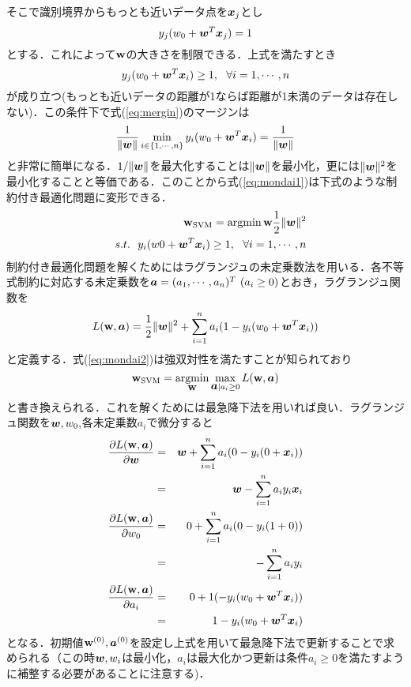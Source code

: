 \documentclass[a4j]{jsarticle}
\def\vec#1{\mbox{\boldmath $#1$}}
\newcommand{\argmin}{\mathop{\rm argmin}\limits}
\begin{document}
そこで識別境界からもっとも近いデータ点を$\vec{x}_j$とし
\begin{equation}
	y_j(w_0+\vec{w}^T\vec{x}_j)=1
\end{equation}
とする．これによって$\vec{\rm w}$の大きさを制限できる．上式を満たすとき
\begin{equation}
	\label{omomi_seigen}
		y_j(w_0+\vec{w}^T\vec{x}_i)\ge 1,~~\forall i=1,\cdots,n
\end{equation}
が成り立つ(もっとも近いデータの距離が1ならば距離が1未満のデータは存在しない)．この条件下で式(\ref{eq:mergin})のマージンは
\begin{equation}
	\frac{1}{\| \vec w \|}\min_{i \in \{1,\cdots,n\}}y_i (w_0 + \vec{w}^T \vec{x}_i) = \frac{1}{\| \vec w \|}
\end{equation}
と非常に簡単になる．$1/\|\vec w\|$を最大化することは$\|\vec w\|$を最小化，更には$\| \vec w\|^2$を最小化することと等価である．このことから式(\ref{eq:mondai1})は下式のような制約付き最適化問題に変形できる．
\begin{eqnarray}
	\label{eq:mondai2}
	&&\vec{\rm w}_{\rm SVM} = \argmin{\vec{\rm w}}\frac{1}{2}\|\vec w\|^2 \nonumber \\
	&&s.t.~~y_i(w0+\vec{w}^T\vec{x}_i)\ge 1,~~\forall i=1,\cdots,n
\end{eqnarray}
制約付き最適化問題を解くためにはラグランジュの未定乗数法を用いる．各不等式制約に対応する未定乗数を$\vec{a}=(a_1,\cdots,a_n)^T~(a_i\ge0)$とおき，ラグランジュ関数を
\begin{equation}
	L(\vec{\rm w},\vec a) = \frac{1}{2}\|\vec w\|^2 +\sum^{n}_{i=1}a_i(1-y_i(w_0 + \vec{w}^T\vec{x}_i))
\end{equation}
と定義する．式(\ref{eq:mondai2})は強双対性を満たすことが知られており\cite{強双対}
\begin{equation}
	\vec{\rm w}_{\rm SVM} = \argmin_{\vec{\rm w}} \max_{\vec{a}|a_i\ge0}L(\vec{\rm w},\vec{a})
\end{equation}
と書き換えられる．これを解くためには最急降下法を用いれば良い．ラグランジュ関数を$\vec{w},w_0,$各未定乗数$a_i$で微分すると
\begin{eqnarray}
	\label{eq:saikyuu1}
	\frac{\partial L(\vec{\rm w},\vec{a})}{\partial \vec w} &=& \vec w + \sum^{n}_{i=1}a_i(0-y_i(0+\vec{x}_i)) \nonumber \\
	&=& \vec w - \sum^{n}_{i=1}a_i y_i \vec{x}_i \\
	\label{eq:saikyuu2}
	\frac{\partial L(\vec{\rm w},\vec{a})}{\partial w_0} &=& 0+ \sum^{n}_{i=1}a_i(0-y_i(1+0)) \nonumber \\
	&=& -\sum^{n}_{i=1}a_iy_i  \\
	\frac{\partial L(\vec{\rm w},\vec{a})}{\partial a_i}&=& 0+ 1(-y_i(w_0+\vec{w}^T\vec{x}_i))\nonumber \\
	&=& 1-y_i(w_0 + \vec{w}^T\vec{x}_i)
\end{eqnarray}
となる．初期値$\vec{\rm w}^{(0)},\vec{a}^{(0)}$を設定し上式を用いて最急降下法で更新することで求められる（この時$\vec{w},w_i$は最小化，$a_i$は最大化かつ更新は条件$a_i\ge0$を満たすように補整する必要があることに注意する)．
\end{document}
